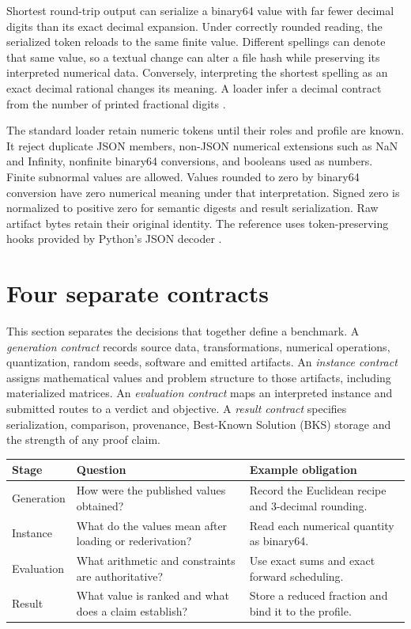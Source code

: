 Shortest round-trip output can serialize a binary64 value with far fewer decimal digits than its exact decimal expansion. Under correctly rounded reading, the serialized token reloads to the same finite value. Different spellings can denote that same value, so a textual change can alter a file hash while preserving its interpreted numerical data. Conversely, interpreting the shortest spelling as an exact decimal rational changes its meaning. A loader \mustnot{} infer a decimal contract from the number of printed fractional digits \autocite{pythonFloatingPoint2026}.

The standard loader \must{} retain numeric tokens until their roles and profile are known. It \must{} reject duplicate JSON members, non-JSON numerical extensions such as NaN and Infinity, nonfinite binary64 conversions, and booleans used as numbers. Finite subnormal values are allowed. Values rounded to zero by binary64 conversion have zero numerical meaning under that interpretation. Signed zero is normalized to positive zero for semantic digests and result serialization. Raw artifact bytes retain their original identity. The reference uses token-preserving hooks provided by Python's JSON decoder \autocite{pythonJSON2026}.

\section{Four separate contracts}\label{sec:layers}
This section separates the decisions that together define a benchmark. A \emph{generation contract} records source data, transformations, numerical operations, quantization, random seeds, software and emitted artifacts. An \emph{instance contract} assigns mathematical values and problem structure to those artifacts, including materialized matrices. An \emph{evaluation contract} maps an interpreted instance and submitted routes to a verdict and objective. A \emph{result contract} specifies serialization, comparison, provenance, Best-Known Solution (BKS) storage and the strength of any proof claim.

\begin{center}
\begin{tabularx}{\linewidth}{@{}lXX@{}}
\toprule
Stage & Question & Example obligation\\
\midrule
Generation & How were the published values obtained? & Record the Euclidean recipe and 3-decimal rounding.\\
Instance & What do the values mean after loading or rederivation? & Read each numerical quantity as binary64.\\
Evaluation & What arithmetic and constraints are authoritative? & Use exact sums and exact forward scheduling.\\
Result & What value is ranked and what does a claim establish? & Store a reduced fraction and bind it to the profile.\\
\bottomrule
\end{tabularx}
\end{center}

